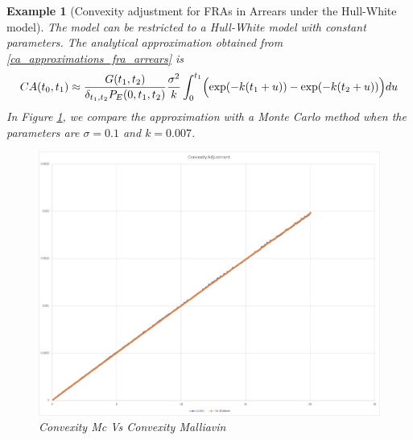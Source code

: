 \documentclass[a4paper,10pt]{article}
\newtheorem{example}[theorem]{Example}
\newcommand{\1}{\mathbf{1}}
\begin{document}
\begin{example}[Convexity adjustment for FRAs in Arrears under the Hull-White model]\label{example_convexity_hw_FRAsinArrears}
The model can be restricted to a Hull-White model with constant parameters. The analytical approximation obtained from \eqref{ca_approximations_fra_arrears} is
\begin{equation*}
CA(t_0,t_1) \approx \frac{G(t_1,t_2)}{\delta_{t_1,t_2}P_{E}(0,t_1,t_2)}  \frac{\sigma^{2}}{k} \int_{0}^{t_1} \Bigl(\exp(- k(t_1 + u)) -   \exp(- k(t_2 + u))\Bigr) du 
\end{equation*}
In Figure \ref{fig:FRA_HW}, we compare the approximation with a Monte Carlo method when the parameters are $\sigma=0.1$ and $k=0.007$.
\begin{figure}[H]
		\begin{center}
		\includegraphics[scale=0.3]{Figures/fra_convexity.jpg}
		\end{center}
		\caption{Convexity Mc Vs Convexity Malliavin}
		\label{fig:FRA_HW}
\end{figure}
\end{example}
\end{document}
